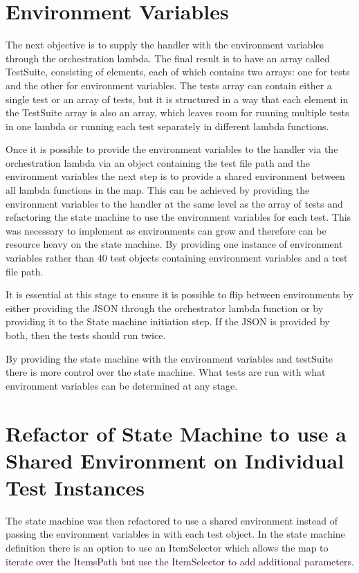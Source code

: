 \documentclass[12pt,a4paper,titlepage]{report}
\begin{document}
\section{Environment Variables}
The next objective is to supply the handler with the environment variables through the orchestration lambda.
The final result is to have an array called TestSuite, consisting of elements, each of which contains two arrays: one for tests and the other for environment variables.
The tests array can contain either a single test or an array of tests, but it is structured in a way that each element in the TestSuite array is also an array,
which leaves room for running multiple tests in one lambda or running each test separately in different lambda functions.

Once it is possible to provide the environment variables to the handler via the orchestration lambda via an
object containing the test file path and the environment variables the next step is to provide a shared environment
between all lambda functions in the map. This can be achieved by providing the environment variables to the handler
at the same level as the array of tests and refactoring the state machine to use the environment variables for
each test. This was necessary to implement as environments can grow and therefore can be resource heavy on the
state machine. By providing one instance of environment variables rather than 40 test objects containing
environment variables and a test file path.

It is essential at this stage to ensure it is possible to flip between environments by either providing the JSON through the
orchestrator lambda function or by providing it to the State machine initiation step. If the JSON is provided by both, then the tests should run twice.

By providing the state machine with the environment variables and testSuite there is more control over the state
machine. What tests are run with what environment variables can be determined at any stage.

\section{Refactor of State Machine to use a Shared Environment on Individual Test Instances }

The state machine was then refactored to use a shared environment instead of
passing the environment variables in with each test object. In the state machine definition there is an option to
use an ItemSelector which allows the map to iterate over the ItemsPath but use the ItemSelector to add additional
parameters.
\end{document}
